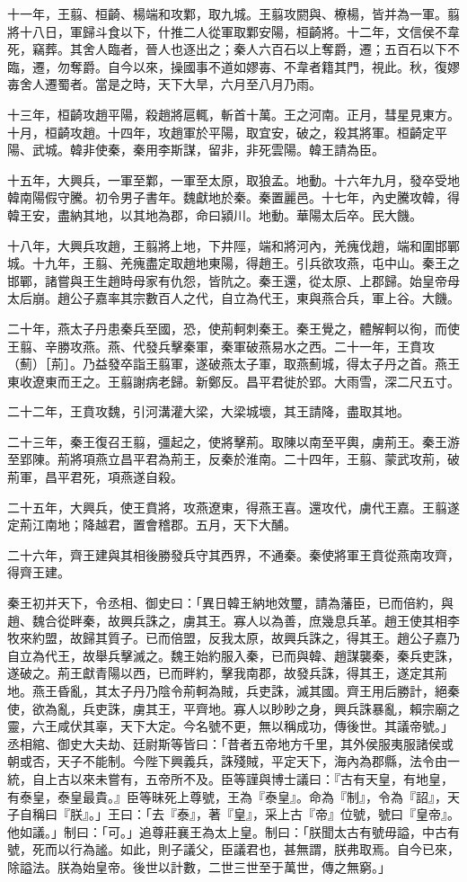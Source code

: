 \begin{pinyinscope}
十一年，王翦、桓齮、楊端和攻鄴，取九城。王翦攻閼與、橑楊，皆并為一軍。翦將十八日，軍歸斗食以下，什推二人從軍取鄴安陽，桓齮將。十二年，文信侯不韋死，竊葬。其舍人臨者，晉人也逐出之；秦人六百石以上奪爵，遷；五百石以下不臨，遷，勿奪爵。自今以來，操國事不道如嫪毐、不韋者籍其門，視此。秋，復嫪毐舍人遷蜀者。當是之時，天下大旱，六月至八月乃雨。

十三年，桓齮攻趙平陽，殺趙將扈輒，斬首十萬。王之河南。正月，彗星見東方。十月，桓齮攻趙。十四年，攻趙軍於平陽，取宜安，破之，殺其將軍。桓齮定平陽、武城。韓非使秦，秦用李斯謀，留非，非死雲陽。韓王請為臣。

十五年，大興兵，一軍至鄴，一軍至太原，取狼孟。地動。十六年九月，發卒受地韓南陽假守騰。初令男子書年。魏獻地於秦。秦置麗邑。十七年，內史騰攻韓，得韓王安，盡納其地，以其地為郡，命曰潁川。地動。華陽太后卒。民大饑。

十八年，大興兵攻趙，王翦將上地，下井陘，端和將河內，羌瘣伐趙，端和圍邯鄲城。十九年，王翦、羌瘣盡定取趙地東陽，得趙王。引兵欲攻燕，屯中山。秦王之邯鄲，諸嘗與王生趙時母家有仇怨，皆阬之。秦王還，從太原、上郡歸。始皇帝母太后崩。趙公子嘉率其宗數百人之代，自立為代王，東與燕合兵，軍上谷。大饑。

二十年，燕太子丹患秦兵至國，恐，使荊軻刺秦王。秦王覺之，體解軻以徇，而使王翦、辛勝攻燕。燕、代發兵擊秦軍，秦軍破燕易水之西。二十一年，王賁攻（薊）［荊］。乃益發卒詣王翦軍，遂破燕太子軍，取燕薊城，得太子丹之首。燕王東收遼東而王之。王翦謝病老歸。新鄭反。昌平君徙於郢。大雨雪，深二尺五寸。

二十二年，王賁攻魏，引河溝灌大梁，大梁城壞，其王請降，盡取其地。

二十三年，秦王復召王翦，彊起之，使將擊荊。取陳以南至平輿，虜荊王。秦王游至郢陳。荊將項燕立昌平君為荊王，反秦於淮南。二十四年，王翦、蒙武攻荊，破荊軍，昌平君死，項燕遂自殺。

二十五年，大興兵，使王賁將，攻燕遼東，得燕王喜。還攻代，虜代王嘉。王翦遂定荊江南地；降越君，置會稽郡。五月，天下大酺。

二十六年，齊王建與其相後勝發兵守其西界，不通秦。秦使將軍王賁從燕南攻齊，得齊王建。

秦王初并天下，令丞相、御史曰：「異日韓王納地效璽，請為藩臣，已而倍約，與趙、魏合從畔秦，故興兵誅之，虜其王。寡人以為善，庶幾息兵革。趙王使其相李牧來約盟，故歸其質子。已而倍盟，反我太原，故興兵誅之，得其王。趙公子嘉乃自立為代王，故舉兵擊滅之。魏王始約服入秦，已而與韓、趙謀襲秦，秦兵吏誅，遂破之。荊王獻青陽以西，已而畔約，擊我南郡，故發兵誅，得其王，遂定其荊地。燕王昏亂，其太子丹乃陰令荊軻為賊，兵吏誅，滅其國。齊王用后勝計，絕秦使，欲為亂，兵吏誅，虜其王，平齊地。寡人以眇眇之身，興兵誅暴亂，賴宗廟之靈，六王咸伏其辜，天下大定。今名號不更，無以稱成功，傳後世。其議帝號。」丞相綰、御史大夫劫、廷尉斯等皆曰：「昔者五帝地方千里，其外侯服夷服諸侯或朝或否，天子不能制。今陛下興義兵，誅殘賊，平定天下，海內為郡縣，法令由一統，自上古以來未嘗有，五帝所不及。臣等謹與博士議曰：『古有天皇，有地皇，有泰皇，泰皇最貴。』臣等昧死上尊號，王為『泰皇』。命為『制』，令為『詔』，天子自稱曰『朕』。」王曰：「去『泰』，著『皇』，采上古『帝』位號，號曰『皇帝』。他如議。」制曰：「可。」追尊莊襄王為太上皇。制曰：「朕聞太古有號毋謚，中古有號，死而以行為謐。如此，則子議父，臣議君也，甚無謂，朕弗取焉。自今已來，除謚法。朕為始皇帝。後世以計數，二世三世至于萬世，傳之無窮。」


\end{pinyinscope}
